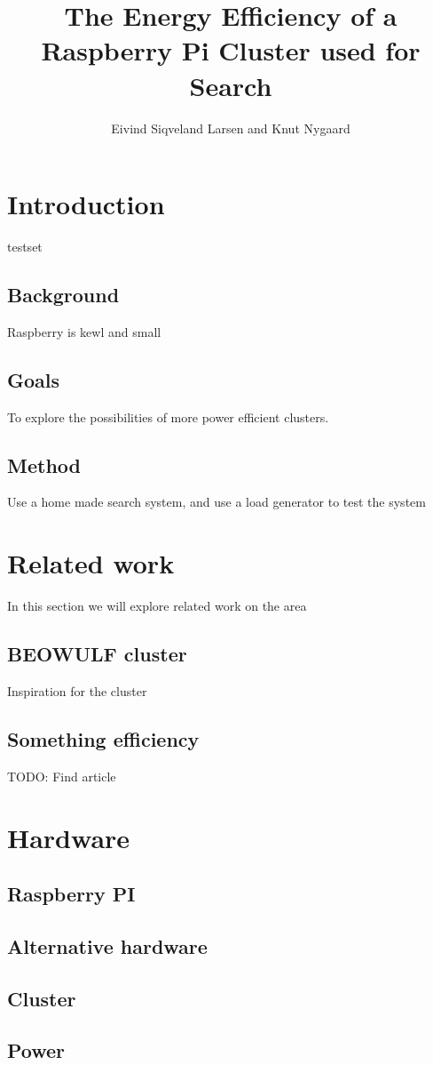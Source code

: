 \documentclass[a4paper, 12pt]{article}
\title{The Energy Efficiency of a Raspberry Pi Cluster used for Search}
\author{Eivind Siqveland Larsen and Knut Nygaard}
\begin{document}
\maketitle
\section{Introduction}
testset
\subsection{Background}
Raspberry is kewl and small
\subsection{Goals}
To explore the possibilities of more power efficient clusters.
\subsection{Method}
Use a home made search system, and use a load generator to test the system
\tableofcontents

\section{Related work}
In this section we will explore related work on the area
\subsection{BEOWULF cluster}
Inspiration for the cluster
\subsection{Something efficiency}
TODO: Find article

\section{Hardware}
\subsection{Raspberry PI}
\subsection{Alternative hardware}
\subsection{Cluster}
\subsection{Power}
\end{document}
